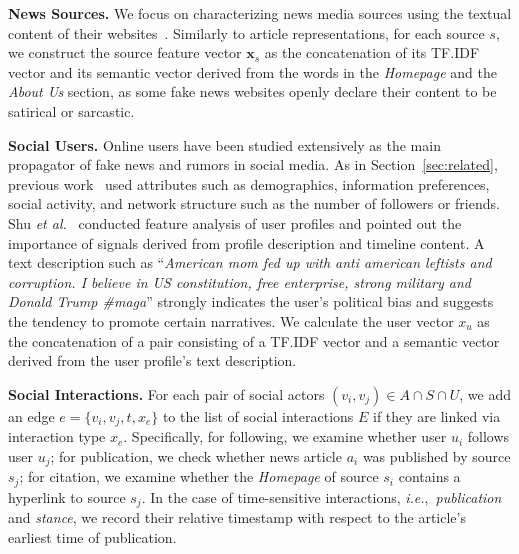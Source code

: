\documentclass[sigconf]{acmart}
\theoremstyle{definition}
\theoremstyle{hypothesis}
\begin{document}
\textbf{News Sources.} 
We focus on characterizing news media sources using the textual content of their websites~\cite{baly2018predicting,kulkarni2018multi}. Similarly to article representations, for each source $s$, we construct the source feature vector $\boldsymbol{x}_s$ as the concatenation of its TF.IDF vector and its semantic vector derived from 
the words in the \emph{Homepage} and the \emph{About Us} section, as some fake news websites openly declare their content to be satirical or sarcastic.

\textbf{Social Users.} Online users have been studied extensively as the main propagator of fake news and rumors in social media. As in Section~\ref{sec:related}, previous work~\cite{castillo2011information,yang2012automatic} used attributes such as demographics, information preferences, social activity, and network structure such as the number of followers or 
friends. 
Shu {\it et al.}~\cite{shu2019beyond} conducted feature analysis of user profiles and pointed out the importance of signals derived from profile description and timeline content. A text description such as ``\emph{American mom fed up with anti american leftists and corruption. I believe in US constitution, free enterprise, strong military and Donald Trump \#maga}'' strongly indicates the user's political bias and suggests the tendency to promote certain narratives. We calculate the user vector $x_u$ as the concatenation of a pair consisting of a TF.IDF vector and a semantic vector derived from the user profile's text description. 

\textbf{Social Interactions.} For each pair of social actors $(v_i, v_j)\in A\cap S\cap U$, we add an edge $e=\{v_i, v_j, t, x_e\}$ to the list of social interactions $E$ if they are linked via interaction type $x_e$. Specifically, for following, we examine whether user $u_i$ follows user $u_j$; for publication, we check whether news article $a_i$ was published by source $s_j$; for citation, we examine whether the \emph{Homepage} of source $s_i$ contains a hyperlink to source $s_j$. In the case of time-sensitive interactions, \textit{i.e.},~\textit{publication} and \textit{stance}, we record their relative timestamp with respect to the article's earliest time of publication.
\end{document}
